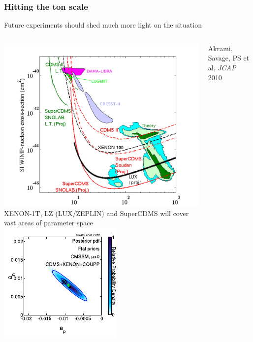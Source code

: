 \documentclass[xcolor=dvipsnames]{beamer}
\begin{document}
\begin{frame}

\frametitle{Hitting the ton scale}

Future experiments should shed much more light on the situation

\begin{columns}[t]
\includegraphics[width=\columnwidth]{dd_proj}\\
XENON-1T, LZ (LUX/ZEPLIN) and SuperCDMS will cover vast areas of parameter space
\includegraphics[width=0.9\columnwidth]{Akrami_BM1}

\vspace{4mm}
\centering
{\tiny Akrami, Savage, PS et al, \emph{JCAP} 2010}
\end{columns}

\end{frame}
\end{document}
